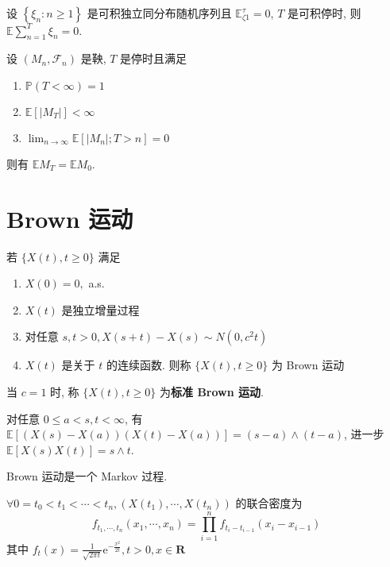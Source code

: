 \documentclass[10pt]{yerbaformat}
\begin{document}
\begin{theorem}[Wald 等式]
    设 $\left\{\xi_{n}: n \geq 1\right\}$ 是可积独立同分布随机序列且 $\mathbb{E}_{\zeta 1}^{\tau}=0$, $T$ 是可积停时, 则 $\mathbb{E} \sum_{n=1}^{T} \xi_{n}=0 .$
\end{theorem}

\begin{theorem}[停止定理]
    设 $\left(M_{n}, \mathcal{F}_{n}\right)$ 是鞅, $T$ 是停时且满足
    \begin{enumerate}
        \item $\mathbb{P}(T<\infty)=1$
        \item $\mathbb{E}\left[\left|M_{T}\right|\right]<\infty$
        \item $\lim _{n \rightarrow \infty} \mathbb{E}\left[\left|M_{n}\right| ; T>n\right]=0$
    \end{enumerate}
    则有 $\mathbb{E} M_{T}=\mathbb{E} M_{0}$.
\end{theorem}

\section{Brown 运动}

\begin{definition}
    若 $\{X(t), t \geq 0\}$ 满足
    \begin{enumerate}
        \item $X(0)=0,$ a.s.
        \item $X(t)$ 是独立增量过程
        \item 对任意 $s, t>0, X(s+t)-X(s) \sim N\left(0, c^{2} t\right)$
        \item $X(t)$ 是关于 $t$ 的连续函数. 则称 $\{X(t), t \geq 0\}$ 为 Brown 运动
    \end{enumerate}
    当 $c=1$ 时, 称 $\{X(t), t \geq 0\}$ 为\textbf{标准 Brown 运动}.
\end{definition}

\begin{theorem}
    对任意 $0 \leq a<s, t<\infty$, 有$\mathbb{E}[(X(s)-X(a))(X(t)-X(a))]=(s-a) \wedge(t-a)$, 进一步 $\mathbb{E}[X(s) X(t)]=s \wedge t$.
\end{theorem}

\begin{theorem}
    Brown 运动是一个 Markov 过程.
\end{theorem}

\begin{theorem}[有限维分布]
    $\forall 0=t_{0}<t_{1}<\cdots<t_{n},\left(X\left(t_{1}\right), \cdots, X\left(t_{n}\right)\right)$ 的联合密度为 $$f_{t_{1}, \cdots, t_{n}}\left(x_{1}, \cdots, x_{n}\right)=\prod_{i=1}^{n} f_{t_{i}-t_{i-1}}\left(x_{i}-x_{i-1}\right)$$ 其中 $f_{t}(x)=\frac{1}{\sqrt{2 \pi t}} \mathrm{e}^{-\frac{x^{2}}{2 t}}, t>0, x \in \mathbf{R}$
\end{theorem}
\end{document}
